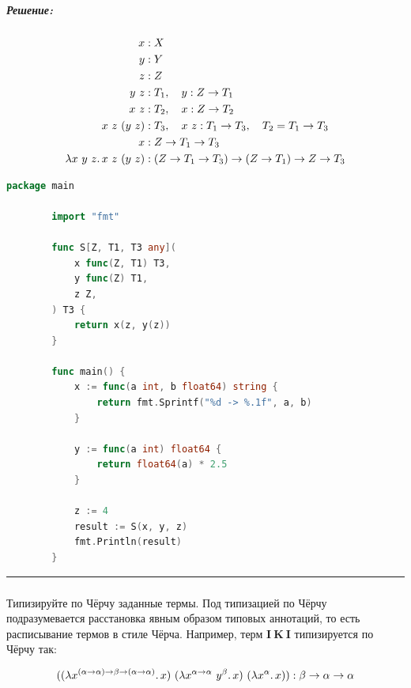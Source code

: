 \documentclass{article}
\newenvironment{proof}{\subparagraph{\hspace{-1em}Решение:\newline}}{\par\noindent\rule{\textwidth}{0.4pt}}
\newcommand{\term}[1]{\mathbf{#1}}
\newcommand{\ap}{~}
\begin{document}
    \begin{proof}
        \[
            \begin{aligned}
                x & : X \\
                y & : Y \\
                z & : Z \\
                y\ z & : T_1, \quad y : Z \to T_1 \\
                x\ z & : T_2, \quad x : Z \to T_2 \\
                x\ z\ (y\ z) & : T_3, \quad x\ z : T_1 \to T_3, \quad T_2 = T_1 \to T_3 \\
                x & : Z \to T_1 \to T_3 \\
                \lambda x~y~z \ldotp x\ z\ (y\ z)
                & : (Z \to T_1 \to T_3) \to (Z \to T_1) \to Z \to T_3
            \end{aligned}
        \]

        \begin{lstlisting}[language=Go,label={lst:s}]
        package main

        import "fmt"

        func S[Z, T1, T3 any](
            x func(Z, T1) T3,
            y func(Z) T1,
            z Z,
        ) T3 {
            return x(z, y(z))
        }

        func main() {
            x := func(a int, b float64) string {
                return fmt.Sprintf("%d -> %.1f", a, b)
            }

            y := func(a int) float64 {
                return float64(a) * 2.5
            }

            z := 4
            result := S(x, y, z)
            fmt.Println(result)
        }
        \end{lstlisting}
    \end{proof}

    \subsubsection{}

    Типизируйте по Чёрчу заданные термы.
    Под типизацией по Чёрчу подразумевается
    расстановка явным образом типовых аннотаций, то есть расписывание термов в стиле
    Чёрча.
    Например, терм $\term{I} \ap \term{K} \ap \term{I}$ типизируется по Чёрчу
    так:

    \[((\lambda x^{(\alpha \to \alpha) \to \beta \to (\alpha \to \alpha)}\ldotp x) \ap (\lambda x^{\alpha \to \alpha} \ap y^\beta\ldotp x) \ap (\lambda x^\alpha\ldotp x)):
    \beta \to \alpha \to \alpha\]
\end{document}
